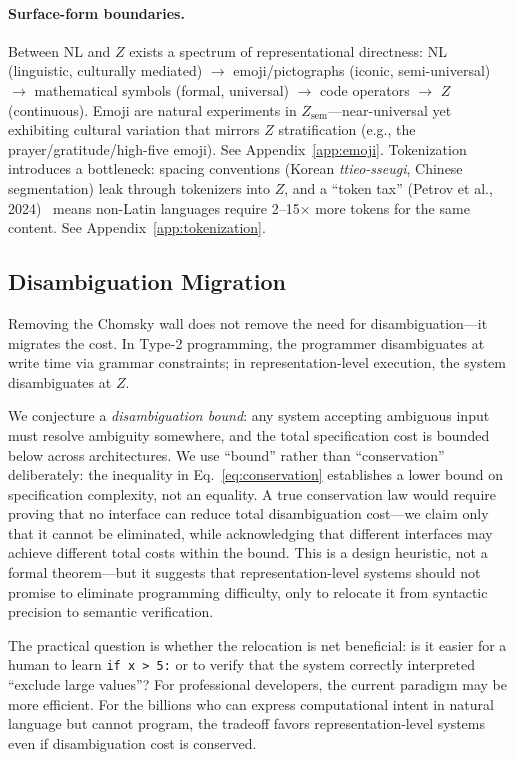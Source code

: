 \documentclass[11pt]{article}
\theoremstyle{definition}
\newcommand{\Zsem}{Z_{\text{sem}}}
\begin{document}
\paragraph{Surface-form boundaries.}
Between NL and $Z$ exists a spectrum of representational directness: NL (linguistic, culturally mediated) $\to$ emoji/pictographs (iconic, semi-universal) $\to$ mathematical symbols (formal, universal) $\to$ code operators $\to$ $Z$ (continuous). Emoji are natural experiments in $\Zsem$---near-universal yet exhibiting cultural variation that mirrors $Z$ stratification (e.g., the prayer/gratitude/high-five emoji). See Appendix~\ref{app:emoji}. Tokenization introduces a bottleneck: spacing conventions (Korean \emph{ttieo-sseugi}, Chinese segmentation) leak through tokenizers into $Z$, and a ``token tax'' (Petrov et al., 2024)~\cite{petrov2024tokenizers} means non-Latin languages require 2--15$\times$ more tokens for the same content. See Appendix~\ref{app:tokenization}.

\subsection{Disambiguation Migration}\label{sec:disambiguation}

Removing the Chomsky wall does not remove the need for disambiguation---it migrates the cost. In Type-2 programming, the programmer disambiguates at write time via grammar constraints; in representation-level execution, the system disambiguates at $Z$.

We conjecture a \emph{disambiguation bound}: any system accepting ambiguous input must resolve ambiguity somewhere, and the total specification cost is bounded below across architectures. We use ``bound'' rather than ``conservation'' deliberately: the inequality in Eq.~\ref{eq:conservation} establishes a lower bound on specification complexity, not an equality. A true conservation law would require proving that no interface can reduce total disambiguation cost---we claim only that it cannot be eliminated, while acknowledging that different interfaces may achieve different total costs within the bound. This is a design heuristic, not a formal theorem---but it suggests that representation-level systems should not promise to eliminate programming difficulty, only to relocate it from syntactic precision to semantic verification.

The practical question is whether the relocation is net beneficial: is it easier for a human to learn \texttt{if x > 5:} or to verify that the system correctly interpreted ``exclude large values''? For professional developers, the current paradigm may be more efficient. For the billions who can express computational intent in natural language but cannot program, the tradeoff favors representation-level systems even if disambiguation cost is conserved.
\end{document}
